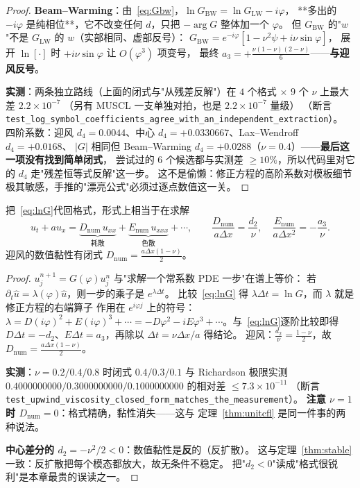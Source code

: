 \begin{proof}
\textbf{Beam--Warming}：由~\eqref{eq:Gbw}，$\ln G_{\text{BW}}=\ln G_{\text{LW}}-i\varphi$，
**多出的 $-i\varphi$ 是纯相位**，它不改变任何 $d$，只把 $-\arg G$ 整体加一个 $\varphi$。
但 $G_{\text{BW}}$ 的"$w$"不是 $G_{\text{LW}}$ 的 $w$（实部相同、虚部反号）：
$G_{\text{BW}}=e^{-i\varphi}[1-\nu^2\psi+i\nu\sin\varphi]$，
展开 $\ln[\cdot]$ 时 $+i\nu\sin\varphi$ 让 $O(\varphi^3)$ 项变号，
最终 $a_3=+\tfrac{\nu(1-\nu)(2-\nu)}{6}$——\textbf{与迎风反号}。

\textbf{实测}：两条独立路线（上面的闭式与"从残差反解"）在
$4$ 个格式 $\times$ $9$ 个 $\nu$ 上最大差 $2.2\times10^{-7}$
（另有 MUSCL 一支单独对拍，也是 $2.2\times10^{-7}$ 量级）
（断言 \texttt{test\_log\_symbol\_coefficients\_agree\_with\_an\_independent\_extraction}）。
四阶系数：迎风 $d_4=0.0044$、中心 $d_4=+0.0330667$、Lax--Wendroff $d_4=+0.0168$、
$|G|$ 相同但 Beam--Warming $d_4=+0.0288$（$\nu=0.4$）——\textbf{最后这一项没有找到简单闭式}，
尝试过的 $6$ 个候选都与实测差 $\ge10\%$，所以代码里对它的 $d_4$ 走"残差恒等式反解"这一步。
这不是偷懒：修正方程的高阶系数对模板细节极其敏感，手推的"漂亮公式"必须过逐点数值这一关。
\end{proof}

\begin{corollary}[数值黏性与数值色散]
\label{cor:visc}
把~\eqref{eq:lnG}代回格式，形式上相当于在求解
\begin{equation}
  u_t+au_x=\underbrace{D_{\text{num}}\,u_{xx}}_{\text{耗散}}+\underbrace{E_{\text{num}}\,u_{xxx}}_{\text{色散}}+\cdots,
  \qquad
  \frac{D_{\text{num}}}{a\Delta x}=\frac{d_2}{\nu},\quad
  \frac{E_{\text{num}}}{a\Delta x^2}=-\frac{a_3}{\nu}.
\end{equation}
迎风的数值黏性有闭式 $D_{\text{num}}=\tfrac{a\Delta x(1-\nu)}{2}$。
\end{corollary}

\begin{proof}
$u_j^{n+1}=G(\varphi)u_j^n$ 与"求解一个常系数 PDE 一步"在谱上等价：
若 $\partial_t\hat u=\lambda(\varphi)\hat u$，则一步的乘子是 $e^{\lambda\Delta t}$。
比较~\eqref{eq:lnG} 得 $\lambda\Delta t=\ln G$，而 $\lambda$ 就是修正方程的右端算子
作用在 $e^{i\varphi j}$ 上的符号：$\lambda=D(i\varphi)^2+E(i\varphi)^3+\cdots
=-D\varphi^2-iE\varphi^3+\cdots$。与~\eqref{eq:lnG}逐阶比较即得
$D\Delta t=-d_2$、$E\Delta t=a_3$，再除以 $\Delta t=\nu\Delta x/a$ 得结论。
迎风：$\tfrac{d_2}{\nu}=\tfrac{1-\nu}{2}$，故 $D_{\text{num}}=\tfrac{a\Delta x(1-\nu)}{2}$。

\textbf{实测}：$\nu=0.2/0.4/0.8$ 时闭式 $0.4/0.3/0.1$ 与 Richardson 极限实测
$0.4000000000/0.3000000000/0.1000000000$ 的相对差 $\le7.3\times10^{-11}$
（断言 \texttt{test\_upwind\_viscosity\_closed\_form\_matches\_the\_measurement}）。
\textbf{注意 $\nu=1$ 时 $D_{\text{num}}=0$}：格式精确，黏性消失——这与
定理~\ref{thm:unitcfl} 是同一件事的两种说法。

\textbf{中心差分的 $d_2=-\nu^2/2<0$}：数值黏性是\textbf{反}的（反扩散）。
这与定理~\ref{thm:stable}一致：反扩散把每个模态都放大，故无条件不稳定。
把"$d_2<0$"读成"格式很锐利"是本章最贵的误读之一。
\end{proof}

